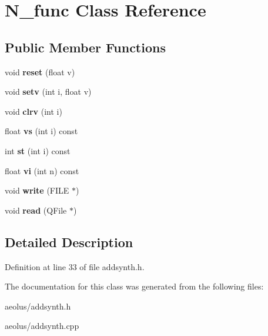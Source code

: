 \hypertarget{class_n__func}{}\section{N\+\_\+func Class Reference}
\label{class_n__func}
\subsection*{Public Member Functions}
\begin{DoxyCompactItemize}
\item 
\mbox{\label{class_n__func_a03fc496a0ca8cd0da8f5cb516c578cd6}} 
void {\bfseries reset} (float v)
\item 
\mbox{\label{class_n__func_a918b361407c19ae4e75613cc1d79b4e6}} 
void {\bfseries setv} (int i, float v)
\item 
\mbox{\label{class_n__func_a03a77d9c17bdfb92c4c273c4ab06006e}} 
void {\bfseries clrv} (int i)
\item 
\mbox{\label{class_n__func_aaaa1404fa589a81811c5775c35453f58}} 
float {\bfseries vs} (int i) const
\item 
\mbox{\label{class_n__func_af76f495b0a570360ec8cf66844168eb9}} 
int {\bfseries st} (int i) const
\item 
\mbox{\label{class_n__func_afc56d24e57eff4eb946358abd9a87bca}} 
float {\bfseries vi} (int n) const
\item 
\mbox{\label{class_n__func_a7c489acc921b19dfaf0613c1315b20e7}} 
void {\bfseries write} (F\+I\+LE $\ast$)
\item 
\mbox{\label{class_n__func_ae9dcfb452a02737694fe4d1de34730bb}} 
void {\bfseries read} (Q\+File $\ast$)
\end{DoxyCompactItemize}


\subsection{Detailed Description}


Definition at line 33 of file addsynth.\+h.



The documentation for this class was generated from the following files\+:\begin{DoxyCompactItemize}
\item 
aeolus/addsynth.\+h\item 
aeolus/addsynth.\+cpp\end{DoxyCompactItemize}

